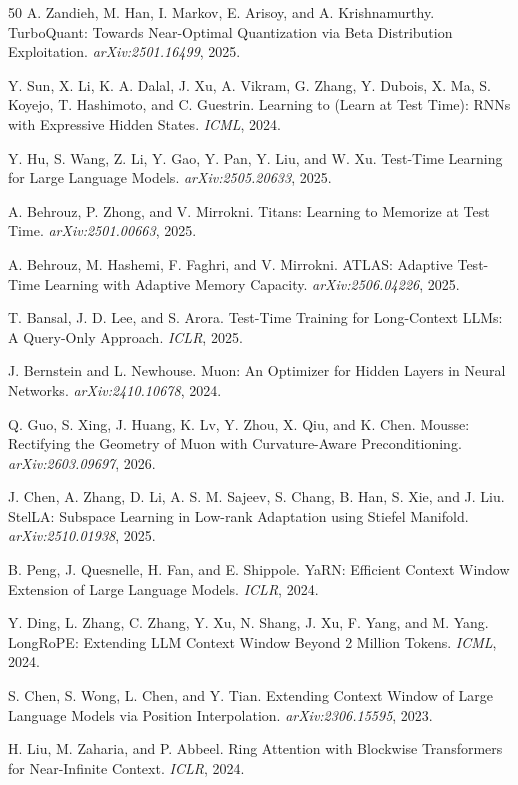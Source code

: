 \documentclass[twocolumn]{article}
\begin{document}
\begin{thebibliography}{50}
A. Zandieh, M. Han, I. Markov, E. Arisoy, and A. Krishnamurthy. TurboQuant: Towards Near-Optimal Quantization via Beta Distribution Exploitation. \emph{arXiv:2501.16499}, 2025.

Y. Sun, X. Li, K. A. Dalal, J. Xu, A. Vikram, G. Zhang, Y. Dubois, X. Ma, S. Koyejo, T. Hashimoto, and C. Guestrin. Learning to (Learn at Test Time): RNNs with Expressive Hidden States. \emph{ICML}, 2024.

Y. Hu, S. Wang, Z. Li, Y. Gao, Y. Pan, Y. Liu, and W. Xu. Test-Time Learning for Large Language Models. \emph{arXiv:2505.20633}, 2025.

A. Behrouz, P. Zhong, and V. Mirrokni. Titans: Learning to Memorize at Test Time. \emph{arXiv:2501.00663}, 2025.

A. Behrouz, M. Hashemi, F. Faghri, and V. Mirrokni. ATLAS: Adaptive Test-Time Learning with Adaptive Memory Capacity. \emph{arXiv:2506.04226}, 2025.

T. Bansal, J. D. Lee, and S. Arora. Test-Time Training for Long-Context LLMs: A Query-Only Approach. \emph{ICLR}, 2025.

J. Bernstein and L. Newhouse. Muon: An Optimizer for Hidden Layers in Neural Networks. \emph{arXiv:2410.10678}, 2024.

Q. Guo, S. Xing, J. Huang, K. Lv, Y. Zhou, X. Qiu, and K. Chen. Mousse: Rectifying the Geometry of Muon with Curvature-Aware Preconditioning. \emph{arXiv:2603.09697}, 2026.

J. Chen, A. Zhang, D. Li, A. S. M. Sajeev, S. Chang, B. Han, S. Xie, and J. Liu. StelLA: Subspace Learning in Low-rank Adaptation using Stiefel Manifold. \emph{arXiv:2510.01938}, 2025.

B. Peng, J. Quesnelle, H. Fan, and E. Shippole. YaRN: Efficient Context Window Extension of Large Language Models. \emph{ICLR}, 2024.

Y. Ding, L. Zhang, C. Zhang, Y. Xu, N. Shang, J. Xu, F. Yang, and M. Yang. LongRoPE: Extending LLM Context Window Beyond 2 Million Tokens. \emph{ICML}, 2024.

S. Chen, S. Wong, L. Chen, and Y. Tian. Extending Context Window of Large Language Models via Position Interpolation. \emph{arXiv:2306.15595}, 2023.

H. Liu, M. Zaharia, and P. Abbeel. Ring Attention with Blockwise Transformers for Near-Infinite Context. \emph{ICLR}, 2024.


\end{thebibliography}
\end{document}
